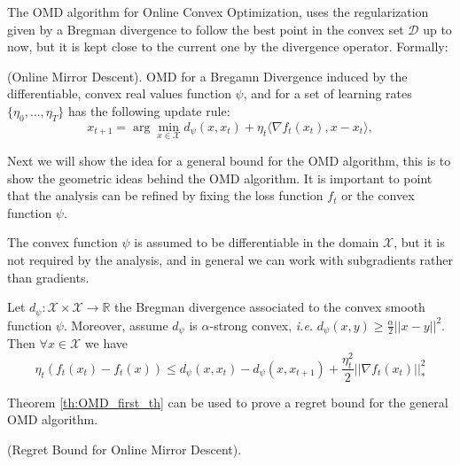 The OMD algorithm for Online Convex Optimization, uses the regularization given by a Bregman divergence to follow the best point in the convex set $\mathcal D$ up to now, but it is kept close to the current one by the divergence operator. Formally:

\begin{definition}(Online Mirror Descent). OMD for a Bregamn Divergence induced by the differentiable, convex real values function $\psi$, and for a set of learning rates $\{\eta_0,\ldots,\eta_T\}$ has the following update rule: 
$$x_{t+1} =\arg\min\limits_{x\in\mathcal X} d_\psi(x,x_t)+\eta_t\langle\nabla f_t(x_t),x-x_t\rangle,$$
\end{definition}

Next we will show the idea for a general bound for the OMD algorithm, this is to show the geometric ideas behind the OMD algorithm. It is important to point that the analysis can be refined by fixing the loss function $f_t$ or the convex function $\psi$.

The convex function $\psi$ is assumed to be differentiable in the domain $\mathcal X$, but it is not required by the analysis, and in general we can work with subgradients rather than gradients.   

\begin{theorem}\label{th:OMD_first_th}
Let $d_\psi:\mathcal X\times\mathcal X\to \mathbb R$ the Bregman divergence associated to the convex smooth function $\psi$. Moreover, assume $d_\psi$ is $\alpha$-strong convex, \emph{i.e.} $d_\psi(x,y)\ge\frac{\alpha}{2}||x-y||^2$.
Then $\forall x\in\mathcal X$ we have 
$$\eta_t (f_t(x_t)-f_t(x))\le d_\psi(x,x_t)-d_\psi(x,x_{t+1})+\frac{\eta_t^2}{2}||\nabla f_t(x_t)||_*^2$$ 
\end{theorem}

Theorem \ref{th:OMD_first_th} can be used to prove a regret bound for the general OMD algorithm. 

\begin{theorem}(Regret Bound for Online Mirror Descent).
\end{theorem}





